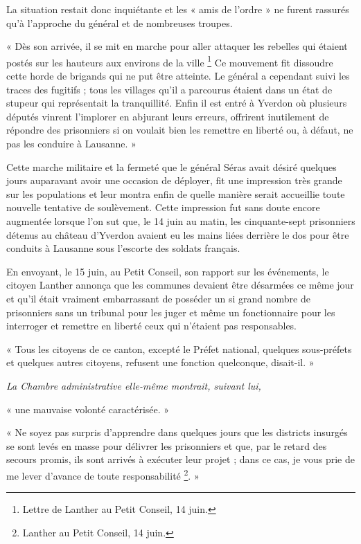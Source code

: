 \documentclass[french,twoside]{book} %
\newenvironment{quoteblock}%
  {\begin{quoting}}
  {\end{quoting}}
\newenvironment{quotebar}{%
    \def\FrameCommand{{\color{rubric!10!}\vrule width 0.5em} \hspace{0.9em}}%
    \def\OuterFrameSep{\itemsep} %
    \MakeFramed {\advance\hsize-\width \FrameRestore}
  }%
  {%
    \endMakeFramed
  }
\renewenvironment{quoteblock}%
  {%
    \savenotes
    \setstretch{0.9}
    \begin{quotebar}
  }
  {%
    \end{quotebar}
    \spewnotes
  }
\begin{document}
\noindent La situation restait donc inquiétante et les « amis de l’ordre » ne furent rassurés qu’à l’approche du général et de nombreuses troupes.\par

\begin{quoteblock}
 \noindent « Dès son arrivée, il se mit en marche pour aller attaquer les rebelles qui étaient postés sur les hauteurs aux environs de la ville \footnote{Lettre de Lanther au Petit Conseil, 14 juin.} Ce mouvement fit dissoudre cette horde de brigands qui ne put être atteinte. Le général a cependant suivi les traces des fugitifs ; tous les villages qu’il a parcourus étaient dans un état de stupeur qui représentait la tranquillité. Enfin il est entré à Yverdon où plusieurs députés vinrent l’implorer en abjurant leurs erreurs, offrirent inutilement de répondre des prisonniers si on voulait bien les remettre en liberté ou, à défaut, ne pas les conduire à Lausanne. »
 \end{quoteblock}

\noindent Cette marche militaire et la fermeté que le général Séras avait désiré quelques jours auparavant avoir une occasion de déployer, fit une impression très grande sur les populations et leur montra enfin de quelle manière serait accueillie toute nouvelle tentative de soulèvement. Cette impression fut sans doute encore augmentée lorsque l’on sut que, le 14 juin au matin, les cinquante-sept prisonniers détenus au château d’Yverdon avaient eu les mains liées derrière le dos pour être conduits à Lausanne sous l’escorte des soldats français.\par
En envoyant, le 15 juin, au Petit Conseil, son rapport sur les événements, le citoyen Lanther annonça que les communes devaient être désarmées ce même jour et qu’il était vraiment embarrassant de posséder un si grand nombre de prisonniers sans un tribunal pour les juger et même un fonctionnaire pour les interroger et remettre en liberté ceux qui n’étaient pas responsables.\par

\begin{quoteblock}
 \noindent « Tous les citoyens de ce canton, excepté le Préfet national, quelques sous-préfets et quelques autres citoyens, refusent une fonction quelconque, disait-il. »\par
 {\itshape La Chambre administrative elle-même montrait, suivant lui,}\par
 « une mauvaise volonté caractérisée. »\par
 « Ne soyez pas surpris d’apprendre dans quelques jours que les districts insurgés se sont levés en masse pour délivrer les prisonniers et que, par le retard des secours promis, ils sont arrivés à exécuter leur projet ; dans ce cas, je vous prie de me lever d’avance de toute responsabilité \footnote{Lanther au Petit Conseil, 14 juin.}. »
 \end{quoteblock}
\end{document}
